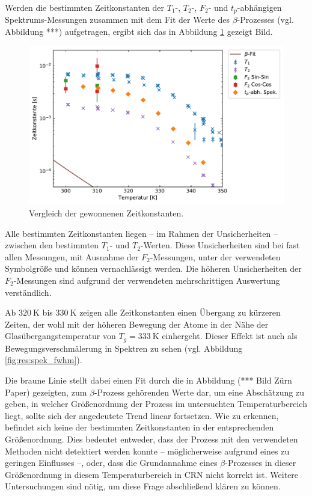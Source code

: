 Werden die bestimmten Zeitkonstanten der $T_1$-, $T_2$-, $F_2$- und $t_p$-abhängigen Spek\-trums-Mess\-un\-gen zusammen mit dem Fit der Werte des $\beta$-Prozesses (vgl. Abbildung ***) aufgetragen, ergibt sich das in Abbildung \ref{fig:res:dynvgl} gezeigt Bild.
\begin{figure}
	\begin{center}
		\includegraphics[width=.9\textwidth]{graphics/plot/dyn.pdf}
	\end{center}
	\caption{Vergleich der gewonnenen Zeitkonstanten.} \label{fig:res:dynvgl}
\end{figure}
Alle bestimmten Zeitkonstanten liegen -- im Rahmen der Unsicherheiten -- zwischen den bestimmten $T_1$- und $T_2$-Werten. Diese Unsicherheiten sind bei fast allen Messungen, mit Ausnahme der $F_2$-Messungen, unter der verwendeten Symbolgröße und können vernachlässigt werden. Die höheren Unsicherheiten der $F_2$-Messungen sind aufgrund der verwendeten mehrschrittigen Auswertung verständlich.

Ab $\SI{320}{\kelvin}$ bis $\SI{330}{\kelvin}$ zeigen alle Zeitkonstanten einen Übergang zu kürzeren Zeiten, der wohl mit der höheren Bewegung der Atome in der Nähe der Glasübergangstemperatur von $T_g = \SI{333}{\kelvin}$ einhergeht. Dieser Effekt ist auch als Bewegungsverschmälerung in Spektren zu sehen (vgl. Abbildung \ref{fig:res:spek_fwhm}).

Die braune Linie stellt dabei einen Fit durch die in Abbildung (*** Bild Zürn Paper) gezeigten, zum $\beta$-Prozess gehörenden Werte dar, um eine Abschätzung zu geben, in welcher Größenordnung der Prozess im untersuchten Temperaturbereich liegt, sollte sich der angedeutete Trend linear fortsetzen. Wie zu erkennen, befindet sich keine der bestimmten Zeitkonstanten in der entsprechenden Größenordnung. Dies bedeutet entweder, dass der Prozess mit den verwendeten Methoden nicht detektiert werden konnte -- möglicherweise aufgrund eines zu geringen Einflusses --, oder, dass die Grundannahme eines $\beta$-Prozesses in dieser Größenordnung in diesem Temperaturbereich in CRN nicht korrekt ist. Weitere Untersuchungen sind nötig, um diese Frage abschließend klären zu können.



